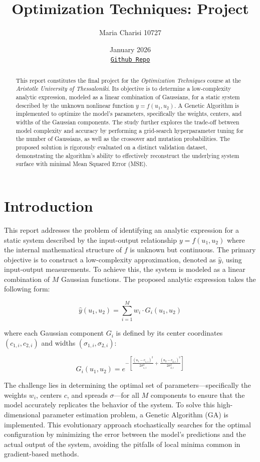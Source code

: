 \documentclass[11pt]{article}
\title{Optimization Techniques: Project}
\author{Maria Charisi 10727}
\date{January 2026\\ 
\href{https://github.com/mariaxarisi/Optimization-Techniques}{\texttt{Github Repo}}}
\begin{document}
\maketitle

\begin{abstract}
This report constitutes the final project for the \textit{Optimization Techniques} course at the \textit{Aristotle University of Thessaloniki}. Its objective is to determine a low-complexity analytic expression, modeled as a linear combination of Gaussians, for a static system described by the unknown nonlinear function $y = f(u_1, u_2)$. A Genetic Algorithm is implemented to optimize the model's parameters, specifically the weights, centers, and widths of the Gaussian components. The study further explores the trade-off between model complexity and accuracy by performing a grid-search hyperparameter tuning for the number of Gaussians, as well as the crossover and mutation probabilities. The proposed solution is rigorously evaluated on a distinct validation dataset, demonstrating the algorithm's ability to effectively reconstruct the underlying system surface with minimal Mean Squared Error (MSE).
\end{abstract}

\tableofcontents
\newpage

\section{Introduction}

This report addresses the problem of identifying an analytic expression for a static system described by the input-output relationship $y = f(u_1, u_2)$ where the internal mathematical structure of $f$ is unknown but continuous. The primary objective is to construct a low-complexity approximation, denoted as $\hat{y}$, using input-output measurements. To achieve this, the system is modeled as a linear combination of $M$ Gaussian functions. The proposed analytic expression takes the following form:

$$\hat{y}(u_1, u_2) = \sum_{i=1}^{M} w_i \cdot G_i(u_1, u_2)$$

where each Gaussian component $G_i$ is defined by its center coordinates $(c_{1,i}, c_{2,i})$ and widths $(\sigma_{1,i}, \sigma_{2,i})$:

$$G_i(u_1, u_2) = e^{- \left[ \frac{(u_1 - c_{1,i})^2}{2\sigma_{1,i}^2} + \frac{(u_2 - c_{2,i})^2}{2\sigma_{2,i}^2} \right]}$$

The challenge lies in determining the optimal set of parameters—specifically the weights $w_i$, centers $c$, and spreads $\sigma$—for all $M$ components to ensure that the model accurately replicates the behavior of the system. To solve this high-dimensional parameter estimation problem, a Genetic Algorithm (GA) is implemented. This evolutionary approach stochastically searches for the optimal configuration by minimizing the error between the model’s predictions and the actual output of the system, avoiding the pitfalls of local minima common in gradient-based methods.
\end{document}
